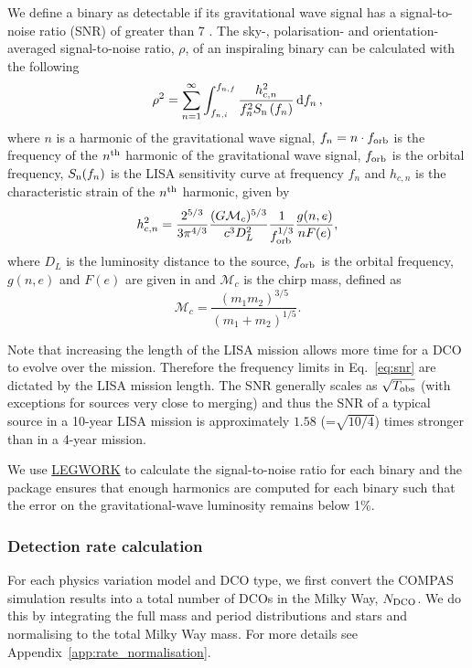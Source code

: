 We define a binary as detectable if its gravitational wave signal has a signal-to-noise ratio (SNR) of greater than 7  \citep[e.g.][]{Breivik+2020, Korol+2020}. The sky-, polarisation- and orientation-averaged signal-to-noise ratio, $\rho$, of an inspiraling binary can be calculated with the following \citep[e.g.][]{Finn+2000}
\begin{equation}\label{eq:snr}
    \rho^2 = \sum_{n=1}^{\infty} \int_{f_{n, i}}^{f_{n, f}} \frac{h_{c, n}^{2}}{f_{n}^{2} S_{\rm n}\left(f_{n}\right)} \dd{f_n},
\end{equation}
where $n$ is a harmonic of the gravitational wave signal, $f_n = n \cdot f_{\rm orb}$ is the frequency of the $n^{\rm th}$ harmonic of the gravitational wave signal, $f_{\rm orb}$ is the orbital frequency, $S_{\rm n}(f_n)$ is the LISA sensitivity curve at frequency $f_n$ \citep[e.g.][]{Robson+2019} and $h_{c,n}$ is the characteristic strain of the $n^{\rm th}$ harmonic, given by \citep[e.g.][]{Barack+2004}
\begin{equation}\label{eq:charstrain}
    h^2_{c,n} = \frac{2^{5/3}}{3 \pi^{4/3}} \frac{(G \mathcal{M}_c)^{5/3}}{c^3 D_L^2} \frac{1}{f_{\rm orb}^{1/3}} \frac{g(n,e)}{n F(e)},
\end{equation}
where $D_L$ is the luminosity distance to the source, $f_{\rm orb}$ is the orbital frequency, $g(n, e)$ and $F(e)$ are given in \citet{Peters+1963} and $\mathcal{M}_c$ is the chirp mass, defined as
\begin{equation}\label{eq:chirp_mass}
    \mathcal{M}_c = \frac{(m_1 m_2)^{3/5}}{(m_1 + m_2)^{1/5}}.
\end{equation}

Note that increasing the length of the LISA mission allows more time for a DCO to evolve over the mission. Therefore the frequency limits in Eq.~\ref{eq:snr} are dictated by the LISA mission length. The SNR generally scales as $\sqrt{T_{\rm obs}}$ (with exceptions for sources very close to merging) and thus the SNR of a typical source in a 10-year LISA mission is approximately $1.58$ (=$\sqrt{10/4}$) times stronger than in a 4-year mission.

We use \href{https://legwork.readthedocs.io/en/latest/}{LEGWORK} \citep{Wagg+2021} to calculate the signal-to-noise ratio for each binary and the package ensures that enough harmonics are computed for each binary such that the error on the gravitational-wave luminosity remains below 1\%.

\subsubsection{Detection rate calculation}
For each physics variation model and DCO type, we first convert the COMPAS simulation results into a total number of DCOs in the Milky Way, $N_{\rm DCO}$. We do this by integrating the full mass and period distributions and stars and normalising to the total Milky Way mass. For more details see Appendix~\ref{app:rate_normalisation}.

